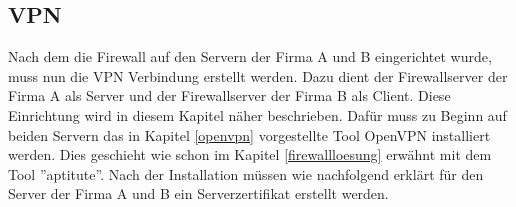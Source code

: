 \subsection{VPN}
Nach dem die Firewall auf den Servern der Firma A und B eingerichtet wurde, muss nun die VPN Verbindung erstellt werden. Dazu dient der Firewallserver der Firma A als Server und der Firewallserver der Firma B als Client. Diese Einrichtung wird in diesem Kapitel näher beschrieben. \newline
Dafür muss zu Beginn auf beiden Servern das in Kapitel \ref{openvpn} vorgestellte Tool OpenVPN installiert werden. Dies geschieht wie schon im Kapitel \ref{firewallloesung}  erwähnt mit dem Tool ''aptitute''. Nach der Installation müssen wie nachfolgend erklärt für den Server der Firma A und B ein Serverzertifikat erstellt werden.

